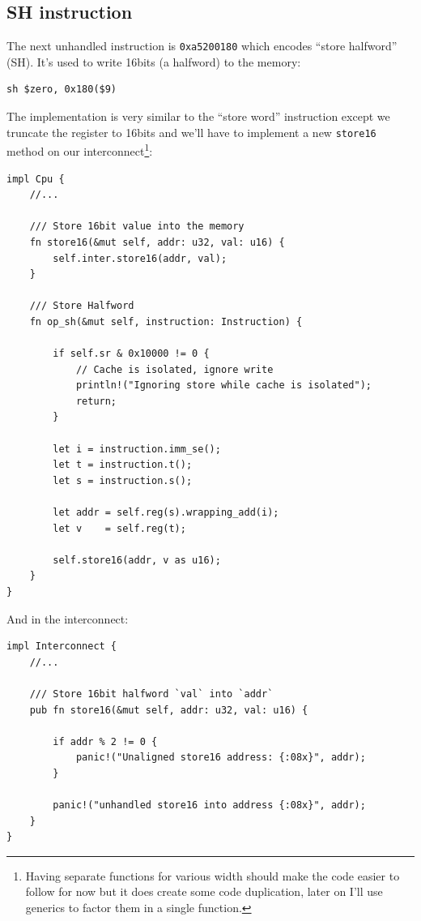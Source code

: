 \documentclass[a4paper]{article}
\newcommand{\code}[1] {\texttt{#1}}
\begin{document}
\subsection{SH instruction}

The next unhandled instruction is \code{0xa5200180} which encodes
``store halfword'' (SH). It's used to write 16bits (a halfword) to the
memory:

\begin{lstlisting}[language=assembly]
sh $zero, 0x180($9)
\end{lstlisting}

The implementation is very similar to the ``store word'' instruction
except we truncate the register to 16bits and we'll have to implement
a new \code{store16} method on our interconnect\footnote{Having
  separate functions for various width should make the code easier to
  follow for now but it does create some code duplication, later on
  I'll use generics to factor them in a single function.}:

\begin{lstlisting}
impl Cpu {
    //...

    /// Store 16bit value into the memory
    fn store16(&mut self, addr: u32, val: u16) {
        self.inter.store16(addr, val);
    }

    /// Store Halfword
    fn op_sh(&mut self, instruction: Instruction) {

        if self.sr & 0x10000 != 0 {
            // Cache is isolated, ignore write
            println!("Ignoring store while cache is isolated");
            return;
        }

        let i = instruction.imm_se();
        let t = instruction.t();
        let s = instruction.s();

        let addr = self.reg(s).wrapping_add(i);
        let v    = self.reg(t);

        self.store16(addr, v as u16);
    }
}
\end{lstlisting}

And in the interconnect:

\begin{lstlisting}
impl Interconnect {
    //...

    /// Store 16bit halfword `val` into `addr`
    pub fn store16(&mut self, addr: u32, val: u16) {

        if addr % 2 != 0 {
            panic!("Unaligned store16 address: {:08x}", addr);
        }

        panic!("unhandled store16 into address {:08x}", addr);
    }
}
\end{lstlisting}
\end{document}
